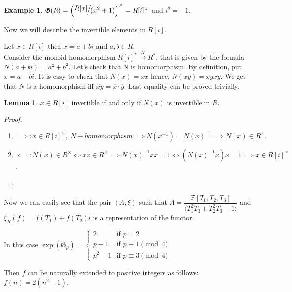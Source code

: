 \documentclass{article}
\theoremstyle{definition}
\newtheorem{example}{Example}
\theoremstyle{definition}
\newtheorem{lemma}{Lemma}
\begin{document}
\begin{example}
    $\mathfrak{G}(R) =  \Large{\left( \sfrac{R[x]}{ (x^2+1)}\right)^{\times}} = 
    R[i]^{\times}$ and $i^2 = -1$.


    Now we will describe the invertible elements in $R[i].$

    Let $x \in R[i]$ then $x = a + bi$ and $a, b \in R$.\\
    Consider the monoid homomorphism $R[i]^*  \xrightarrow{\ N\ } R^*$, that is given by the formula $N(a+bi) = a^2 + b^2.$
    Let's check that N is homomorphism.
    By definition, put $\overline{x} = a - bi$. It is easy to check that $N(x) = x\overline{x}$ hence, $N(xy) = 
    xy\overline{xy}$.
    We get that $N$ is a homomorphism iff $\overline{xy} = \overline{x}\cdot\overline{y}.$
    Last equality can be proved trivially.

    \begin{lemma}
        $x \in R[i]$ invertible if and only if $N(x)$ is invertible in $R$.
    \end{lemma}

    \begin{proof}
    \hspace*{5cm}
    \begin{enumerate}  
         \item $\implies: x \in R[i]^{\times},\ N - homomorphism \implies N(x^{-1}) = N(x)^{-1} \implies N(x)  \in R^{\times}.$
        \item $\impliedby:N(x) \in R^{\times} \iff x\overline{x} \in R^{\times} \implies N(x)^{-1}x\overline{x} = 
        1 \iff (N(x)^{-1}\overline{x})x = 1\implies x \in R[i]^{\times}$.
    \end{enumerate}
    \end{proof}



Now we can easily see that the pair $(A, \xi)$ such that 
$A = \dfrac{\mathbb{Z}[T_1, T_2, T_3]}{\langle T_1^2T_3+T_2^2T_3-1\rangle}$ and $\xi_R(f)=f(T_1)+f(T_2)i$ is a representation 
of the functor.

In this case $\operatorname{exp}(\mathfrak{G}_p) = \begin{cases} 
    2 & \text{if } p = 2 \\
    p - 1 & \text{if } p \equiv 1 \pmod{4} \\
    p^2 - 1 & \text{if } p \equiv 3 \pmod{4}
\end{cases}$

Then $f$ can be naturally extended to positive integers as follows: $f(n) = 2(n^2 - 1)$.


\end{example}
\end{document}
